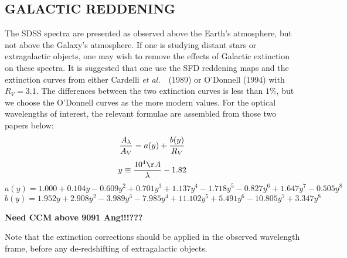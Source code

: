 \documentclass[12pt,preprint]{aastex}
\newcommand{\etal}{{\it et al.}~}
\begin{document}
\subsection{GALACTIC REDDENING}

The SDSS spectra are presented as observed above the Earth's
atmosphere, but not above the Galaxy's atmosphere.
If one is studying distant stars or extragalactic objects,
one may wish to remove the effects of Galactic extinction
on these spectra.  It is suggested that one use the SFD reddening
maps and the extinction curves from either Cardelli \etal\ (1989)
or O'Donnell (1994) with $R_V=3.1$.  The differences between the
two extinction curves is less than $1\%$, but we choose the O'Donnell
curves as the more modern values.  For the optical wavelengths
of interest, the relevant formulae are
assembled from those two papers below:
$$ {A_\lambda \over A_V} = a(y) + {b(y)\over R_V} $$
$$ y \equiv {10^4\AA \over \lambda} - 1.82 $$
$$ a(y) = 1.000 + 0.104 y - 0.609 y^2 + 0.701 y^3 + 1.137 y^4
  - 1.718 y^5 - 0.827 y^6 + 1.647 y^7 - 0.505 y^8 $$
$$ b(y) = 1.952 y + 2.908 y^2 - 3.989 y^3 - 7.985 y^4
  + 11.102 y^5 + 5.491 y^6 - 10.805 y^7 + 3.347 y^8 $$

{\bf Need CCM above 9091 Ang!!!???}

Note that the extinction corrections should be applied in the
observed wavelength frame, before any de-redshifting of extragalactic objects.



\newpage



\end{document}
